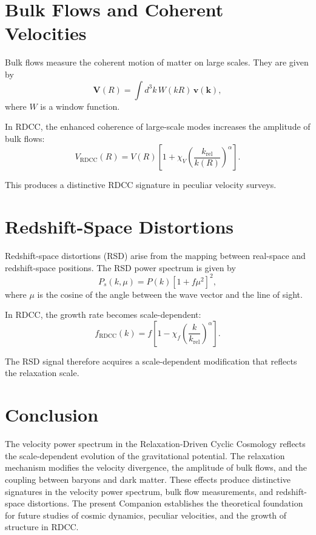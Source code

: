 \documentclass[11pt,a4paper]{article}
\begin{document}
\section{Bulk Flows and Coherent Velocities}

Bulk flows measure the coherent motion of matter on large scales. They are given by
\begin{equation}
    \mathbf{V}(R)
    = \int d^{3}k\,
      W(kR)\,
      \mathbf{v}(\mathbf{k}),
\end{equation}
where $W$ is a window function.

In RDCC, the enhanced coherence of large-scale modes increases the amplitude of 
bulk flows:
\begin{equation}
    V_{\mathrm{RDCC}}(R)
    = V(R)
      \left[
        1 + \chi_{V}
        \left(\frac{k_{\mathrm{rel}}}{k(R)}\right)^{\alpha}
      \right].
\end{equation}

This produces a distinctive RDCC signature in peculiar velocity surveys.
\section{Redshift-Space Distortions}

Redshift-space distortions (RSD) arise from the mapping between real-space and 
redshift-space positions. The RSD power spectrum is given by
\begin{equation}
    P_{s}(k,\mu)
    = P(k)
      \left[
        1 + f\mu^{2}
      \right]^{2},
\end{equation}
where $\mu$ is the cosine of the angle between the wave vector and the line of 
sight.

In RDCC, the growth rate becomes scale-dependent:
\begin{equation}
    f_{\mathrm{RDCC}}(k)
    = f
      \left[
        1 - \chi_{f}
        \left(\frac{k}{k_{\mathrm{rel}}}\right)^{\alpha}
      \right].
\end{equation}

The RSD signal therefore acquires a scale-dependent modification that reflects the 
relaxation scale.
\section{Conclusion}

The velocity power spectrum in the Relaxation-Driven Cyclic Cosmology reflects the 
scale-dependent evolution of the gravitational potential. The relaxation mechanism 
modifies the velocity divergence, the amplitude of bulk flows, and the coupling 
between baryons and dark matter. These effects produce distinctive signatures in 
the velocity power spectrum, bulk flow measurements, and redshift-space 
distortions. The present Companion establishes the theoretical foundation for 
future studies of cosmic dynamics, peculiar velocities, and the growth of 
structure in RDCC.


\nocite{*}

\end{document}
